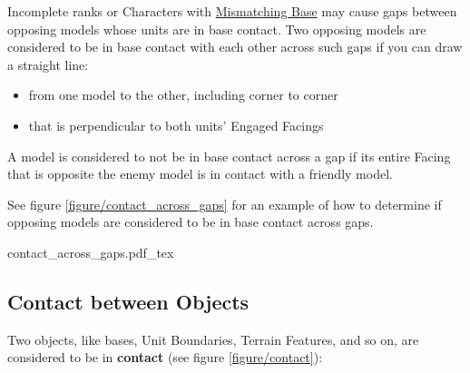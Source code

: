 Incomplete ranks or Characters with \hyperref[mismatching_bases]{Mismatching Base} may cause gaps between opposing models whose units are in base contact. Two opposing models are considered to be in base contact with each other across such gaps if you can draw a straight line:
\begin{itemize}
	\item from one model to the other, including corner to corner
	\item that is perpendicular to both units' Engaged Facings
\end{itemize}

A model is considered to not be in base contact across a gap if its entire Facing that is opposite the enemy model is in contact with a friendly model.

See figure \ref{figure/contact_across_gaps} for an example of how to determine if opposing models are considered to be in base contact across gaps.

\begin{Figure}
	\centering
	\Fanchor
	\def\svgwidth{0.66\textwidth}
	{contact_across_gaps.pdf_tex}
	\caption{Base contact between models across gaps.\captionposttitle
		The unit at the bottom has Charged the unit on top in the Rear Facing. Due to the Charged unit's incomplete rear rank, some models are in base contact across gaps.\captionpar
		a) This line connects 1 with A and B. B's entire Rear Facing is however in contact with F, so 1 is in base contact across a gap only with A (it still is in \enquote{normal} base contact with F).\captionpar
		b) This line connects C with 2 and 3. C is in base contact with both 2 and 3.\captionpar
		c) This line connects E with 5 and 6. E is in base contact with both 5 and 6.	%
	}
	\label{figure/contact_across_gaps}
\end{Figure}

\subsection{Contact between Objects}
\label{contact_between_objects}

Two objects, like bases, Unit Boundaries, Terrain Features, and so on, are considered to be in \textbf{contact} (see figure \ref{figure/contact}):

